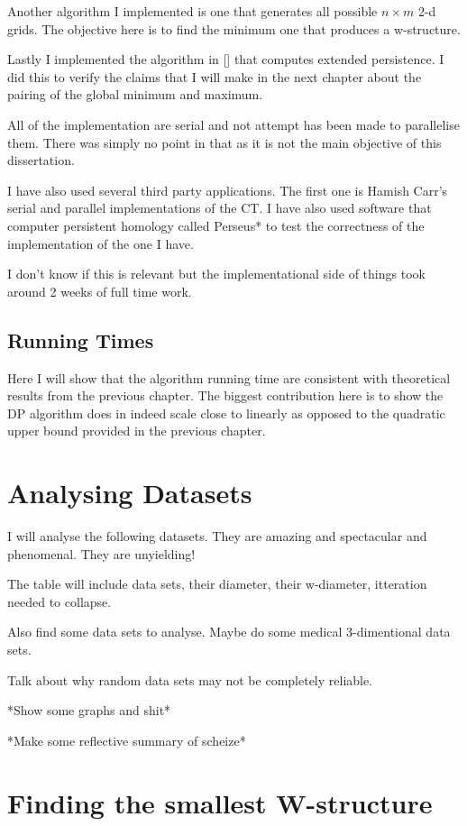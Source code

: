Another algorithm I implemented is one that generates all possible $n \times m$ 2-d grids. The objective here is to find the minimum one that produces a w-structure.

Lastly I implemented the algorithm in [] that computes extended persistence. I did this to verify the claims that I will make in the next chapter about the pairing of the global minimum and maximum.

All of the implementation are serial and not attempt has been made to parallelise them. There was simply no point in that as it is not the main objective of this dissertation.

I have also used several third party applications. The first one is Hamish Carr's serial and parallel implementations of the CT. I have also used software that computer persistent homology called Perseus* to test the correctness of the implementation of the one I have.

I don't know if this is relevant but the implementational side of things took around 2 weeks of full time work. 

\subsection{Running Times}

Here I will show that the algorithm running time are consistent with theoretical results from the previous chapter. The biggest contribution here is to show the DP algorithm does in indeed scale close to linearly as opposed to the quadratic upper bound provided in the previous chapter.

\section{Analysing Datasets}

I will analyse the following datasets. They are amazing and spectacular and phenomenal. They are unyielding! 

The table will include data sets, their diameter, their w-diameter, itteration needed to collapse.

Also find some data sets to analyse. Maybe do some medical 3-dimentional data sets.

Talk about why random data sets may not be completely reliable.

*Show some graphs and shit*

*Make some reflective summary of scheize*

\section{Finding the smallest W-structure}

